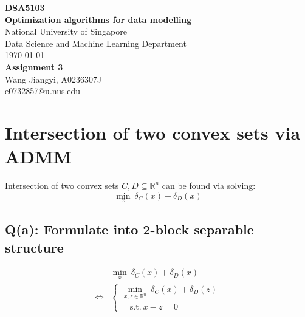 \documentclass{article}
\begin{document}
\begin{titlepage}
	\begin{center}
		\vspace*{1cm}
		\Large{\textbf{DSA5103}}\\
		\Large{\textbf{Optimization algorithms for data modelling}}\\
		\vspace{1cm}
		\small
		National University of Singapore\\
		Data Science and Machine Learning Department\\
		\today \\
		\vfill
		\LARGE{\textbf{Assignment 3}}\\[5mm]
		\vfill
		\small
		Wang Jiangyi, A0236307J\\
		e0732857@u.nus.edu
	\end{center}
\end{titlepage}
\section{Intersection of two convex sets via ADMM}
Intersection of two convex sets $C,D\subseteq \mathbb{R}^n$ can be found via solving:
\begin{equation}
	\nonumber
	\underset{x}{\min} \ \delta_C(x)+\delta_D(x)
\end{equation}
\subsection{Q(a): Formulate into 2-block separable structure}
\begin{align}
	\nonumber
			&\underset{x}{\min}\  \delta_C(x)+\delta_D(x) \\
	\iff 	& \begin{cases}
		\underset{x,z
		\in \mathbb{R}^n}{\min} \ \delta_C(x) + \delta_D(z) \\
		\quad \text{s.t.} \ x-z=0
	\end{cases}
\end{align}
\end{document}
